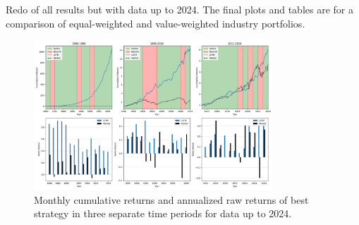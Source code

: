 \documentclass{article}
\begin{document}
Redo of all results but with data up to 2024. The final plots and tables are for a comparison of equal-weighted and value-weighted industry portfolios.

\begin{figure}[H]
    \centering
    \includegraphics[width=0.8\textwidth]{2024_plot2_model_comparison_timeperiods.png}
    \caption{Monthly cumulative returns and annualized raw returns of best strategy in three separate time periods for data up to 2024.}
    \vspace{-10pt}
    \label{fig:timeperiods}
\end{figure}
\end{document}
